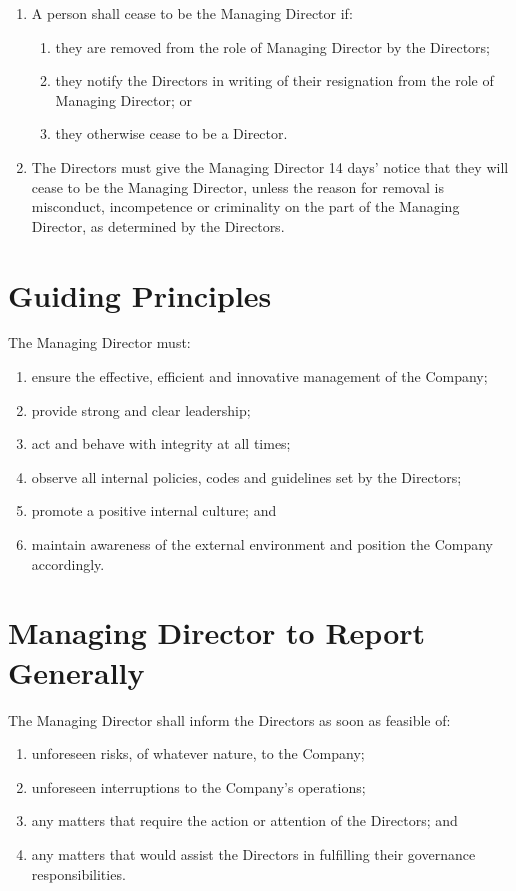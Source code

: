 \documentclass[a4paper,10pt]{article}
\renewcommand{\labelenumi}{(\arabic{enumi})}
\begin{document}
\begin{enumerate}
    \item A person shall cease to be the Managing Director if:
    \begin{enumerate}
        \item they are removed from the role of Managing Director by the Directors;
        \item they notify the Directors in writing of their resignation from the role of Managing Director; or
        \item they otherwise cease to be a Director.
    \end{enumerate}
    \item The Directors must give the Managing Director 14 days' notice that they will cease to be the Managing Director, unless the reason for removal is misconduct, incompetence or criminality on the part of the Managing Director, as determined by the Directors.
\end{enumerate}

\section{Guiding Principles}

The Managing Director must:

\begin{enumerate}
    \renewcommand{\labelenumi}{(\alph{enumi})}
    \item ensure the effective, efficient and innovative management of the Company;
    \item provide strong and clear leadership;
    \item act and behave with integrity at all times;
    \item observe all internal policies, codes and guidelines set by the Directors;
    \item promote a positive internal culture; and
    \item maintain awareness of the external environment and position the Company accordingly.
\end{enumerate}

\section{Managing Director to Report Generally}

The Managing Director shall inform the Directors as soon as feasible of:

\begin{enumerate}
    \renewcommand{\labelenumi}{(\alph{enumi})}
    \item unforeseen risks, of whatever nature, to the Company;
    \item unforeseen interruptions to the Company's operations;
    \item any matters that require the action or attention of the Directors; and
    \item any matters that would assist the Directors in fulfilling their governance responsibilities.
\end{enumerate}
\end{document}
